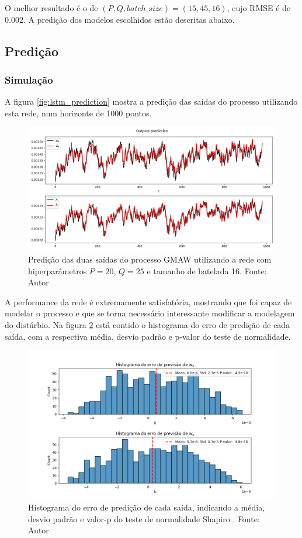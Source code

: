 O melhor resultado é o de $(P,Q,batch\_size)=(15,45,16)$, cujo RMSE é de 0.002. A predição dos modelos escolhidos estão descritas abaixo.

\subsection{Predição}
\subsubsection{Simulação}
A figura \ref{fig:lstm_prediction} mostra a predição das saídas do processo utilizando esta rede, num horizonte de 1000 pontos.
\begin{figure}[hbt!]
    \centering
    \includegraphics[width=0.7\linewidth]{Imagens/chap04/simulation_lstm_prediction.png}
    \caption{Predição das duas saídas do processo GMAW utilizando a rede com hiperparâmetros $P=20$, $Q=25$ e tamanho de batelada 16. Fonte: Autor}
    \label{fig:sim_lstm_prediction}
\end{figure}

A performance da rede é extremamente satisfatória, mostrando que foi capaz de modelar o processo e que se torna necessário interessante modificar a modelagem do distúrbio. Na figura \ref{fig:sim_error_histogram} está contido o histograma do erro de predição de cada saída, com a respectiva média, desvio padrão e p-valor do teste de normalidade. 

\begin{figure}[hbt!]
    \centering
    \includegraphics[width=0.7\linewidth]{Imagens/chap04/simulation_error_histogram.png}
    \caption{Histograma do erro de predição de cada saída, indicando a média, desvio padrão e valor-p do teste de normalidade Shapiro \cite{shapiro1965analysis}. Fonte: Autor.}
    \label{fig:sim_error_histogram}
\end{figure}


